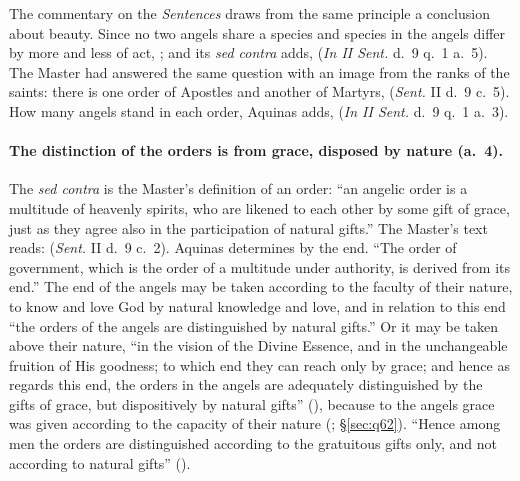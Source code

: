 The commentary on the \emph{Sentences} draws from the same principle a
conclusion about beauty. Since no two angels share a species and species in
the angels differ by more and less of act, ; and its \emph{sed contra}
adds,  (\emph{In II
Sent.} d.~9 q.~1 a.~5). The Master had answered the same question with an
image from the ranks of the saints: there is one order of Apostles and another
of Martyrs,  (\emph{Sent.} II d.~9 c.~5). How many angels
stand in each order, Aquinas adds,  (\emph{In II
Sent.} d.~9 q.~1 a.~3).

\paragraph{The distinction of the orders is from grace, disposed by nature
(a.~4).} The \emph{sed contra} is the Master's definition of an order: ``an
angelic order is a multitude of heavenly spirits, who are likened to each
other by some gift of grace, just as they agree also in the participation of
natural gifts.'' The Master's text reads: 
(\emph{Sent.} II d.~9 c.~2). Aquinas determines by the end. ``The order of
government, which is the order of a multitude under authority, is derived
from its end.'' The end of the angels may be taken according to the faculty
of their nature, to know and love God by natural knowledge and love, and in
relation to this end ``the orders of the angels are distinguished by natural
gifts.'' Or it may be taken above their nature, ``in the vision of the Divine
Essence, and in the unchangeable fruition of His goodness; to which end they
can reach only by grace; and hence as regards this end, the orders in the
angels are adequately distinguished by the gifts of grace, but dispositively
by natural gifts'' (), because to the angels grace was
given according to the capacity of their nature (;
\S\ref{sec:q62}). ``Hence among men the orders are distinguished according to
the gratuitous gifts only, and not according to natural gifts'' ().

